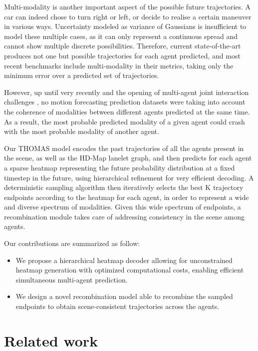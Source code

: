 \documentclass{article} \usepackage{iclr2022_conference,times}
\begin{document}
Multi-modality is another important aspect of the possible future trajectories. A car can indeed chose to turn right or left, or decide to realise a certain maneuver in various ways. Uncertainty modeled as variance of Gaussians is insufficient to model these multiple cases, as it can only represent a continuous spread and cannot show multiple discrete possibilities. Therefore, current state-of-the-art produces not one but  possible trajectories for each agent predicted, and most recent benchmarks \citep{caesar2020nuscenes, chang2019argoverse, zhan2019interaction,ettinger2021large} include multi-modality in their metrics, taking only the minimum error over a predicted set of  trajectories.

However, up until very recently and the opening of multi-agent joint interaction challenges \citep{ettinger2021large, interpret}, no motion forecasting prediction datasets were taking into account the coherence of modalities between different agents predicted at the same time. As a result, the most probable predicted modality of a given agent could crash with the most probable modality of another agent. 


Our THOMAS model encodes the past trajectories of all the agents present in the scene, as well as the HD-Map lanelet graph, and then predicts for each agent a sparse heatmap representing the future probability distribution at a fixed timestep in the future, using hierarchical refinement for very efficient decoding.  A deterministic sampling algorithm then iteratively selects the best K trajectory endpoints according to the heatmap for each agent, in order to represent a wide and diverse spectrum of modalities. Given this wide spectrum of endpoints, a recombination module takes care of addressing  consistency in the scene among agents.



Our contributions are summarized as follow:
\begin{itemize}
    \item We propose a hierarchical heatmap decoder allowing for unconstrained heatmap generation with optimized computational costs, enabling efficient simultaneous multi-agent prediction.
    \item We design a novel recombination model able to recombine the sampled endpoints to obtain scene-consistent trajectories across the agents.
\end{itemize}

\section{Related work}
\label{gen_inst}
\end{document}
